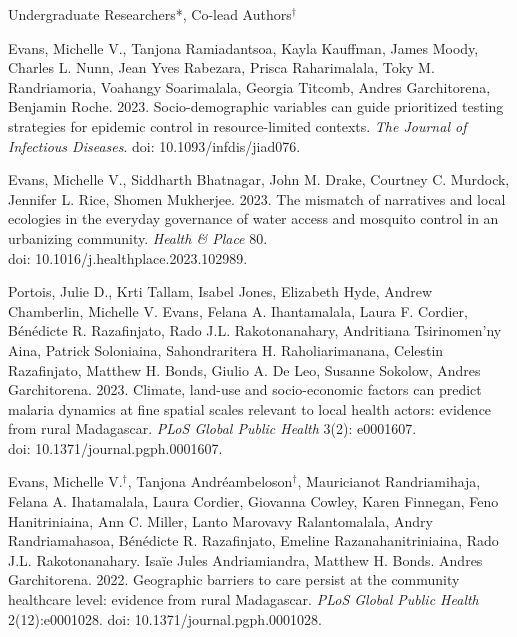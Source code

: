 


\bigskip
Undergraduate Researchers*, Co-lead Authors$^\dagger$

\smallskip

\begin{etaremune}

\item \textcolor{awesome}{Evans, Michelle V.}, Tanjona Ramiadantsoa, Kayla Kauffman, James Moody, Charles L. Nunn, Jean Yves Rabezara, Prisca Raharimalala, Toky M. Randriamoria, Voahangy Soarimalala, Georgia Titcomb, Andres Garchitorena, Benjamin Roche. 2023. Socio-demographic variables can guide prioritized testing strategies for epidemic control in resource-limited contexts. \textit{The Journal of Infectious Diseases}. doi: 10.1093/infdis/jiad076. \smallskip


\item \textcolor{awesome}{Evans, Michelle V.}, Siddharth Bhatnagar, John M. Drake, Courtney C. Murdock, Jennifer L. Rice, Shomen Mukherjee. 2023. The mismatch of narratives and local ecologies in the everyday governance of water access and mosquito control in an urbanizing community. \textit{Health \& Place} 80. \\ doi: 10.1016/j.healthplace.2023.102989. \smallskip

\item Portois, Julie D., Krti Tallam, Isabel Jones, Elizabeth Hyde, Andrew Chamberlin, \textcolor{awesome}{Michelle V. Evans}, Felana A. Ihantamalala, Laura F. Cordier, B\'{e}n\'{e}dicte R. Razafinjato, Rado J.L. Rakotonanahary, Andritiana Tsirinomen'ny Aina, Patrick Soloniaina, Sahondraritera H. Raholiarimanana, Celestin Razafinjato, Matthew H. Bonds, Giulio A. De Leo, Susanne Sokolow, Andres Garchitorena. 2023. Climate, land-use and socio-economic factors can predict malaria dynamics at fine spatial scales relevant to local health actors: evidence from rural Madagascar. \textit{PLoS Global Public Health} 3(2): e0001607. \\ doi: 10.1371/journal.pgph.0001607. \smallskip

\item \textcolor{awesome}{Evans, Michelle V.}$^\dagger$, Tanjona Andr\'{e}ambeloson$^\dagger$, Mauricianot Randriamihaja, Felana A. Ihatamalala, Laura Cordier, Giovanna Cowley, Karen Finnegan, Feno Hanitriniaina, Ann C. Miller, Lanto Marovavy Ralantomalala, Andry Randriamahasoa, B\'{e}n\'{e}dicte R. Razafinjato, Emeline Razanahanitriniaina, Rado J.L. Rakotonanahary. Isa\"{i}e Jules Andriamiandra, Matthew H. Bonds. Andres Garchitorena. 2022. Geographic barriers to care persist at the community healthcare level: evidence from rural Madagascar. \textit{PLoS Global Public Health} 2(12):e0001028. doi: 10.1371/journal.pgph.0001028. \smallskip


\end{etaremune}
